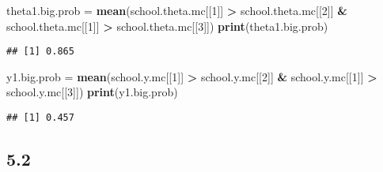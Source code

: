 \documentclass[]{article}
\newenvironment{Shaded}{\begin{snugshade}}{\end{snugshade}}
\newcommand{\DecValTok}[1]{\textcolor[rgb]{0.00,0.00,0.81}{#1}}
\newcommand{\KeywordTok}[1]{\textcolor[rgb]{0.13,0.29,0.53}{\textbf{#1}}}
\newcommand{\NormalTok}[1]{#1}
\newcommand{\OperatorTok}[1]{\textcolor[rgb]{0.81,0.36,0.00}{\textbf{#1}}}
\newcommand{\StringTok}[1]{\textcolor[rgb]{0.31,0.60,0.02}{#1}}
\begin{document}
\begin{Shaded}
\begin{Highlighting}[]
\NormalTok{theta1.big.prob =}\StringTok{ }\KeywordTok{mean}\NormalTok{(school.theta.mc[[}\DecValTok{1}\NormalTok{]] }\OperatorTok{>}\StringTok{ }\NormalTok{school.theta.mc[[}\DecValTok{2}\NormalTok{]] }\OperatorTok{&}\StringTok{ }\NormalTok{school.theta.mc[[}\DecValTok{1}\NormalTok{]] }\OperatorTok{>}\StringTok{ }\NormalTok{school.theta.mc[[}\DecValTok{3}\NormalTok{]])}
\KeywordTok{print}\NormalTok{(theta1.big.prob)}
\end{Highlighting}
\end{Shaded}

\begin{verbatim}
## [1] 0.865
\end{verbatim}

\begin{Shaded}
\begin{Highlighting}[]
\NormalTok{y1.big.prob =}\StringTok{ }\KeywordTok{mean}\NormalTok{(school.y.mc[[}\DecValTok{1}\NormalTok{]] }\OperatorTok{>}\StringTok{ }\NormalTok{school.y.mc[[}\DecValTok{2}\NormalTok{]] }\OperatorTok{&}\StringTok{ }\NormalTok{school.y.mc[[}\DecValTok{1}\NormalTok{]] }\OperatorTok{>}\StringTok{ }\NormalTok{school.y.mc[[}\DecValTok{3}\NormalTok{]])}
\KeywordTok{print}\NormalTok{(y1.big.prob)}
\end{Highlighting}
\end{Shaded}

\begin{verbatim}
## [1] 0.457
\end{verbatim}

\hypertarget{section-1}{%
\subsection{5.2}\label{section-1}}
\end{document}
